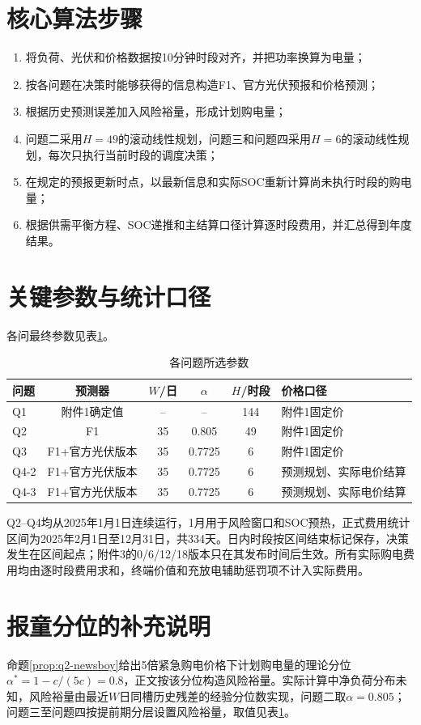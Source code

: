 \documentclass[UTF8,12pt,a4paper]{ctexart}
\theoremstyle{remark}
\begin{document}


\clearpage\appendix
\section{核心算法步骤}
\begin{enumerate}
\item 将负荷、光伏和价格数据按10分钟时段对齐，并把功率换算为电量；
\item 按各问题在决策时能够获得的信息构造F1、官方光伏预报和价格预测；
\item 根据历史预测误差加入风险裕量，形成计划购电量；
\item 问题二采用$H=49$的滚动线性规划，问题三和问题四采用$H=6$的滚动线性规划，每次只执行当前时段的调度决策；
\item 在规定的预报更新时点，以最新信息和实际SOC重新计算尚未执行时段的购电量；
\item 根据供需平衡方程、SOC递推和主结算口径计算逐时段费用，并汇总得到年度结果。
\end{enumerate}

\section{关键参数与统计口径}
各问最终参数见表\ref{tab:appendix-params}。
\begin{table}[htbp]\centering\small
\caption{各问题所选参数}\label{tab:appendix-params}
\begin{tabular}{lccccl}\toprule
问题&预测器&$W$/日&$\alpha$&$H$/时段&价格口径\\\midrule
Q1&附件1确定值&--&--&144&附件1固定价\\
Q2&F1&35&0.805&49&附件1固定价\\
Q3&F1+官方光伏版本&35&0.7725&6&附件1固定价\\
Q4-2&F1+官方光伏版本&35&0.7725&6&预测规划、实际电价结算\\
Q4-3&F1+官方光伏版本&35&0.7725&6&预测规划、实际电价结算\\\bottomrule
\end{tabular}\end{table}

Q2--Q4均从2025年1月1日连续运行，1月用于风险窗口和SOC预热，正式费用统计区间为2025年2月1日至12月31日，共334天。日内时段按区间结束标记保存，决策发生在区间起点；附件3的0/6/12/18版本只在其发布时间后生效。所有实际购电费用均由逐时段费用求和，终端价值和充放电辅助惩罚项不计入实际费用。

\section{报童分位的补充说明}
命题\ref{prop:q2-newsboy}给出5倍紧急购电价格下计划购电量的理论分位$\alpha^\ast=1-c/(5c)=0.8$，正文按该分位构造风险裕量。实际计算中净负荷分布未知，风险裕量由最近$W$日同槽历史残差的经验分位数实现，问题二取$\alpha=0.805$；问题三至问题四按提前期分层设置风险裕量，取值见表\ref{tab:appendix-params}。
\end{document}
